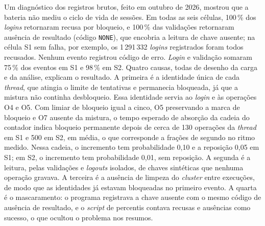 Um diagnóstico dos registros brutos, feito em outubro de 2026, mostrou que a bateria não mediu o ciclo de vida de sessões. Em todas as seis células, 100\,\% dos \emph{logins} retornaram recusa por bloqueio, e 100\,\% das validações retornaram ausência de resultado (código \texttt{NONE}), que encobria a leitura de chave ausente; na célula S1 sem falha, por exemplo, os 1\,291\,332 \emph{logins} registrados foram todos recusados. Nenhum evento registrou código de erro. \emph{Login} e validação somaram 75\,\% dos eventos em S1 e 98\,\% em S2. Quatro causas, todas de desenho da carga e da análise, explicam o resultado. A primeira é a identidade única de cada \emph{thread}, que atingia o limite de tentativas e permanecia bloqueada, já que a mistura não continha desbloqueio. Essa identidade servia ao \emph{login} e às operações O4 e O5. Com limiar de bloqueio igual a cinco, O5 preservando a marca de bloqueio e O7 ausente da mistura, o tempo esperado de absorção da cadeia do contador indica bloqueio permanente depois de cerca de 130 operações da \emph{thread} em S1 e 500 em S2, em média, o que corresponde a frações de segundo no ritmo medido. Nessa cadeia, o incremento tem probabilidade 0,10 e a reposição 0,05 em S1; em S2, o incremento tem probabilidade 0,01, sem reposição.
A segunda é a leitura, pelas validações e \emph{logouts} isolados, de chaves sintéticas que nenhuma operação gravava. A terceira é a ausência de limpeza do \emph{cluster} entre execuções, de modo que as identidades já estavam bloqueadas no primeiro evento. A quarta é o mascaramento: o programa registrava a chave ausente com o mesmo código de ausência de resultado, e o \emph{script} de percentis contava recusas e ausências como sucesso, o que ocultou o problema nos resumos.

